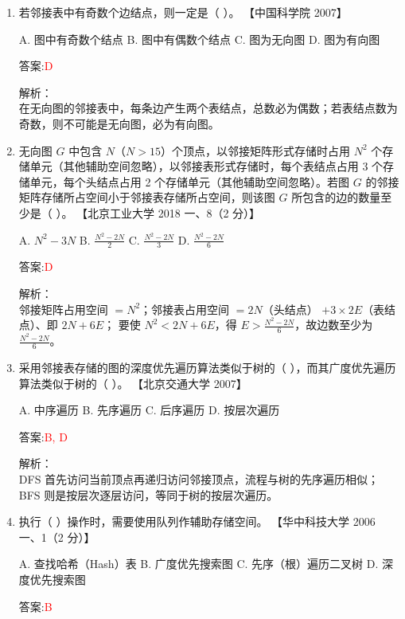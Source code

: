 \documentclass[lang=cn,newtx,10pt,scheme=chinese]{../../../elegantbook}
\begin{document}
\begin{enumerate}
\item 若邻接表中有奇数个边结点，则一定是（ ）。  
    【中国科学院 2007】

    A. 图中有奇数个结点  
    B. 图中有偶数个结点  
    C. 图为无向图  
    D. 图为有向图  

    答案:\textcolor{red}{D}

    解析：\\
    在无向图的邻接表中，每条边产生两个表结点，总数必为偶数；若表结点数为奇数，则不可能是无向图，必为有向图。\\

\item 无向图 $G$ 中包含 $N$（$N>15$）个顶点，以邻接矩阵形式存储时占用 $N^2$ 个存储单元（其他辅助空间忽略），以邻接表形式存储时，每个表结点占用 3 个存储单元，每个头结点占用 2 个存储单元（其他辅助空间忽略）。若图 $G$ 的邻接矩阵存储所占空间小于邻接表存储所占空间，则该图 $G$ 所包含的边的数量至少是（ ）。  
    【北京工业大学 2018 一、8（2 分）】

    A. $N^2 - 3N$  
    B. $\tfrac{N^2 - 2N}{2}$  
    C. $\tfrac{N^2 - 2N}{3}$  
    D. $\tfrac{N^2 - 2N}{6}$  

    答案:\textcolor{red}{D}

    解析：\\
    邻接矩阵占用空间 $=N^2$；邻接表占用空间 $=2N$（头结点） $+3\times2E$（表结点）、即 $2N+6E$；  
    要使 $N^2<2N+6E$，得 $E>\frac{N^2-2N}{6}$，故边数至少为 $\frac{N^2-2N}{6}$。\\

\item 采用邻接表存储的图的深度优先遍历算法类似于树的（ ），而其广度优先遍历算法类似于树的（ ）。  
    【北京交通大学 2007】

    A. 中序遍历  
    B. 先序遍历  
    C. 后序遍历  
    D. 按层次遍历  

    答案:\textcolor{red}{B, D}

    解析：\\
    DFS 首先访问当前顶点再递归访问邻接顶点，流程与树的先序遍历相似；  
    BFS 则是按层次逐层访问，等同于树的按层次遍历。\\

\item 执行（  ）操作时，需要使用队列作辅助存储空间。  
    【华中科技大学 2006 一、1（2 分）】

    A. 查找哈希（Hash）表  
    B. 广度优先搜索图  
    C. 先序（根）遍历二叉树  
    D. 深度优先搜索图  

    答案:\textcolor{red}{B}


\end{enumerate}
\end{document}
